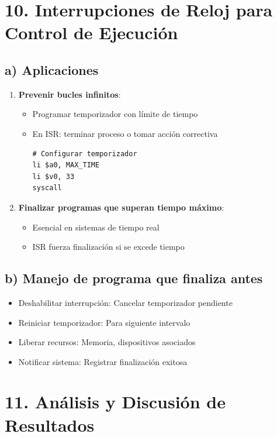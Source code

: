 \documentclass[12pt]{article}
\begin{document}
\section*{10. Interrupciones de Reloj para Control de Ejecución}
\subsection*{a) Aplicaciones}
\begin{enumerate}
    \item \textbf{Prevenir bucles infinitos}:
    \begin{itemize}
        \item Programar temporizador con límite de tiempo
        \item En ISR: terminar proceso o tomar acción correctiva
        \begin{lstlisting}
# Configurar temporizador
li $a0, MAX_TIME
li $v0, 33
syscall
        \end{lstlisting}
    \end{itemize}
    
    \item \textbf{Finalizar programas que superan tiempo máximo}:
    \begin{itemize}
        \item Esencial en sistemas de tiempo real
        \item ISR fuerza finalización si se excede tiempo
    \end{itemize}
\end{enumerate}

\subsection*{b) Manejo de programa que finaliza antes}
\begin{itemize}
    \item Deshabilitar interrupción: Cancelar temporizador pendiente
    \item Reiniciar temporizador: Para siguiente intervalo
    \item Liberar recursos: Memoria, dispositivos asociados
    \item Notificar sistema: Registrar finalización exitosa
\end{itemize}

\section*{11. Análisis y Discusión de Resultados}
\end{document}
